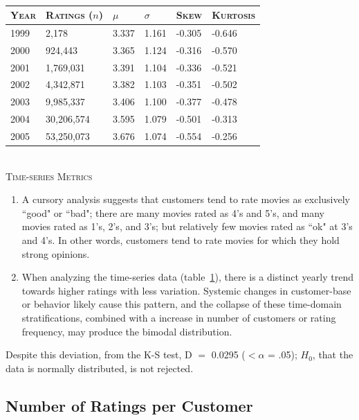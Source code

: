\documentclass{acmtog}
\begin{document}
\begin{table}
\begin{center}
    \begin{tabular}{ | l | l | l |  l | l |  l  |}
    \hline
    \textsc{Year} & \textsc{Ratings ($n$)} & $\mu$ & $\sigma$ & \textsc{Skew} &  \textsc{Kurtosis} \\ \hline
    1999 & 2,178         & 3.337 & 1.161 & -0.305 & -0.646 \\ \hline
    2000 & 924,443     & 3.365 & 1.124 & -0.316 & -0.570 \\ \hline
    2001 & 1,769,031  & 3.391 & 1.104 & -0.336 & -0.521 \\ \hline
    2002 & 4,342,871  & 3.382 & 1.103 & -0.351 & -0.502 \\ \hline
    2003 & 9,985,337  & 3.406 & 1.100 & -0.377 & -0.478 \\ \hline
    2004 & 30,206,574& 3.595 & 1.079 & -0.501 & -0.313 \\ \hline
    2005 & 53,250,073& 3.676 & 1.074 & -0.554 & -0.256  \\ \hline
    \end{tabular}
\\
\textsc{Time-series Metrics}
\end{center}
\caption{}
\label{table:two}
\end{table}

\begin{enumerate}
	\item A cursory analysis suggests that customers tend to rate movies as exclusively ``good" or ``bad"; there are many movies rated as 4's and 5's, and many movies rated as 1's, 2's, and 3's; but relatively few movies rated as ``ok" at 3's and 4's. In other words, customers tend to rate movies for which they hold strong opinions.
	\item When analyzing the time-series data (table~\ref{table:two}), there is a distinct yearly trend towards higher ratings with less variation. Systemic changes in customer-base or behavior likely cause this pattern, and the collapse of these time-domain stratifications, combined with a increase in number of customers or rating frequency, may produce the bimodal distribution.
\end{enumerate}
Despite this deviation, from the K-S test, D $=$ 0.0295 ($<\alpha$ = .05); $H_0$, that the data is normally distributed, is not rejected.



\subsection{Number of Ratings per Customer}
\end{document}
